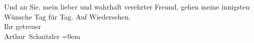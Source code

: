 \begin{ledgroupsized}[t]{13cm}
                    Und an Sie, mein lieber und wahrhaft verehrter Freund, gehen meine innigsten
                    Wünsche {\pb}Tag für Tag.\pend
           \pstart
           Auf Wiedersehen.{\\[\baselineskip]}Ihr getreuer{\\[\baselineskip]}\spacefill\mbox{Arthur Schnitzler}\pend
           \leftskip=0em{}\endnumbering{}\end{ledgroupsized}  \newcommand{\dateiname}{L02465}\newcommand{\titel}{Arthur Schnitzler an Georg Brandes, 3. 1. 1926}\newcommand{\editorInnen}{Martin Anton Müller und Gerd-Hermann Susen}
      